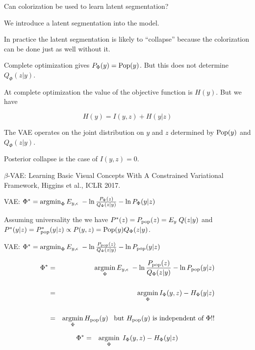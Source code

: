 {\vfill
Can colorization be used to learn latent segmentation?

\vfill
We introduce a latent segmentation into the model.

\vfill
In practice the latent segmentation is likely to ``collapse'' because the colorization can be done just as well without it.



\vfill
Complete optimization gives $P_\Phi(y) = \mathrm{Pop}(y)$.  But this does not determine $Q_\Phi(z|y)$.

\vfill
At complete optimization the value of the objective function is $H(y)$.  But we have

\vfill
$$H(y) = I(y,z) +       H(y|z)$$

\vfill
The VAE operates on the joint distribution on $y$ and $z$ determined by $\mathrm{Pop}(y)$ and $Q_\Phi(z|y)$.

\vfill
Posterior collapse is the case of $I(y,z) = 0$.


$\beta$-VAE: Learning Basic Visual Concepts With A
Constrained Variational Framework, Higgins et al., ICLR 2017.

\vfill
VAE: $\Phi^* = \operatorname*{argmin}_\Phi E_{y,\epsilon}\;-\ln \frac{P_\Phi(z)}{Q_\Phi(z|y)} - \ln P_\Phi(y|z)$

\vfill
Assuming universality the we have $P^*(z) = P_{\mathrm{pop}}(z) = E_y \;Q(z|y)$ and $P^*(y|z) = P^*_{\mathrm{pop}}(y|z) \propto P(y,z) = \mathrm{Pop}(y)Q_\Phi(z|y)$.

\vfill
VAE: $\Phi^* = \operatorname*{argmin}_\Phi E_{y,\epsilon}\;-\ln \frac{P_{\mathrm{pop}}(z)}{Q_\Phi(z|y)} - \ln P_{\mathrm{pop}}(y|z)$


\begin{eqnarray*}
\Phi^* & = & \operatorname*{argmin}_\Phi E_{y,\epsilon}\;-\ln \frac{P_{\mathrm{pop}}(z)}{Q_\Phi(z|y)} - \ln P_{\mathrm{pop}}(y|z) \\
\\
& = & \operatorname*{argmin}_\Phi I_\Phi(y,z) - H_\Phi(y|z) \\
\\
& = & \operatorname*{argmin}_\Phi H_{\mathrm{pop}}(y)\;\;\;\mbox{but $H_{\mathrm{pop}}(y)$ is independent of $\Phi$!!}
\end{eqnarray*}


\begin{eqnarray*}
\Phi^* & = & \operatorname*{argmin}_\Phi \; I_\Phi(y,z) - H_\Phi(y|z)
\end{eqnarray*}

}
